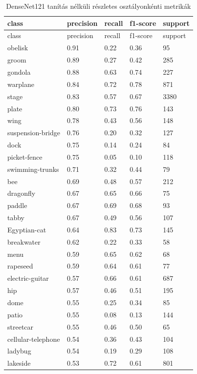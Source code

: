 \begin{center}
\begin{longtable}{lllll}
\caption{DenseNet121 tanítás nélküli részletes osztályonkénti metrikák}\label{tab:phase1_DenseNet121_class_table}\\
\toprule
class & precision & recall & f1-score & support \\
\midrule
\endfirsthead
\toprule
class & precision & recall & f1-score & support \\
\midrule
\endhead
obelisk & 0.91 & 0.22 & 0.36 & 95 \\
groom & 0.89 & 0.27 & 0.42 & 285 \\
gondola & 0.88 & 0.63 & 0.74 & 227 \\
warplane & 0.84 & 0.72 & 0.78 & 871 \\
stage & 0.83 & 0.57 & 0.67 & 3380 \\
plate & 0.80 & 0.73 & 0.76 & 143 \\
wing & 0.78 & 0.43 & 0.56 & 148 \\
suspension-bridge & 0.76 & 0.20 & 0.32 & 127 \\
dock & 0.75 & 0.14 & 0.24 & 84 \\
picket-fence & 0.75 & 0.05 & 0.10 & 118 \\
swimming-trunks & 0.71 & 0.32 & 0.44 & 79 \\
bee & 0.69 & 0.48 & 0.57 & 212 \\
dragonfly & 0.67 & 0.65 & 0.66 & 75 \\
paddle & 0.67 & 0.69 & 0.68 & 93 \\
tabby & 0.67 & 0.49 & 0.56 & 107 \\
Egyptian-cat & 0.64 & 0.83 & 0.73 & 145 \\
breakwater & 0.62 & 0.22 & 0.33 & 58 \\
menu & 0.59 & 0.65 & 0.62 & 68 \\
rapeseed & 0.59 & 0.64 & 0.61 & 77 \\
electric-guitar & 0.57 & 0.66 & 0.61 & 687 \\
hip & 0.57 & 0.46 & 0.51 & 195 \\
dome & 0.55 & 0.25 & 0.34 & 85 \\
patio & 0.55 & 0.08 & 0.13 & 144 \\
streetcar & 0.55 & 0.46 & 0.50 & 65 \\
cellular-telephone & 0.54 & 0.36 & 0.43 & 104 \\
ladybug & 0.54 & 0.19 & 0.29 & 108 \\
lakeside & 0.53 & 0.72 & 0.61 & 801 \\

\end{longtable}
\end{center}
